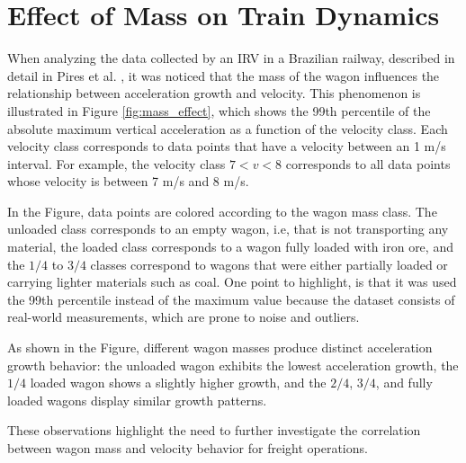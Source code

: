 \section{Effect of Mass on Train Dynamics} \label{sec-mass-effect-measurement}

When analyzing the data collected by an IRV in a Brazilian railway, described in detail in Pires et al. \cite{PIRES2024107191}, it was noticed that the mass of the wagon influences the relationship between acceleration growth and velocity. This phenomenon is illustrated in Figure \ref{fig:mass_effect}, which shows the 99th percentile of the absolute maximum vertical acceleration as a function of the velocity class. Each velocity class corresponds to data points that have a velocity between an 1 m/s interval. For example, the velocity class $7 < v < 8$ corresponds to all data points whose velocity is between 7 m/s and 8 m/s.

In the Figure, data points are colored according to the wagon mass class. The unloaded class corresponds to an empty wagon, i.e, that is not transporting any material, the loaded class corresponds to a wagon fully loaded with iron ore, and the $1/4$ to $3/4$ classes correspond to wagons that were either partially loaded or carrying lighter materials such as coal. One point to highlight, is that it was used the 99th percentile instead of the maximum value because the dataset consists of real-world measurements, which are prone to noise and outliers.

As shown in the Figure, different wagon masses produce distinct acceleration growth behavior: the unloaded wagon exhibits the lowest acceleration growth, the $1/4$ loaded wagon shows a slightly higher growth, and the $2/4$, $3/4$, and fully loaded wagons display similar growth patterns.

These observations highlight the need to further investigate the correlation between wagon mass and velocity behavior for freight operations.

